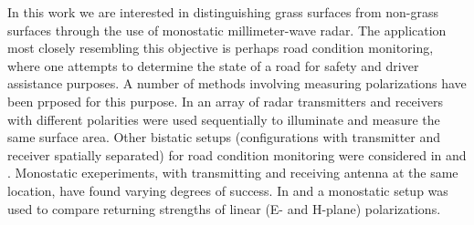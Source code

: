 
In this work we are interested in distinguishing grass surfaces from non-grass surfaces through the use of monostatic millimeter-wave radar. The application most closely resembling this objective is perhaps road condition monitoring, where one attempts to determine the state of a road for safety and driver assistance purposes. A number of methods involving measuring polarizations have been prposed for this purpose. In \citep{finkele_schreck_wanielik_1995} an array of radar transmitters and receivers with different polarities were used sequentially to illuminate and measure the same surface area. Other bistatic setups (configurations with transmitter and receiver spatially separated) for road condition monitoring were considered in \citep{kees_detlefsen_1994} and \citep{finkele_1997}. Monostatic exeperiments, with transmitting and receiving antenna at the same location, have found varying degrees of success. In \citep{viikari_varpula_kantanen_2008} and \citep{hakli_saily_koivisto_huhtinen_dufva_rautiainen_toivanen_nummila_2013} a monostatic setup was used to compare returning strengths of linear (E- and H-plane) polarizations. 



